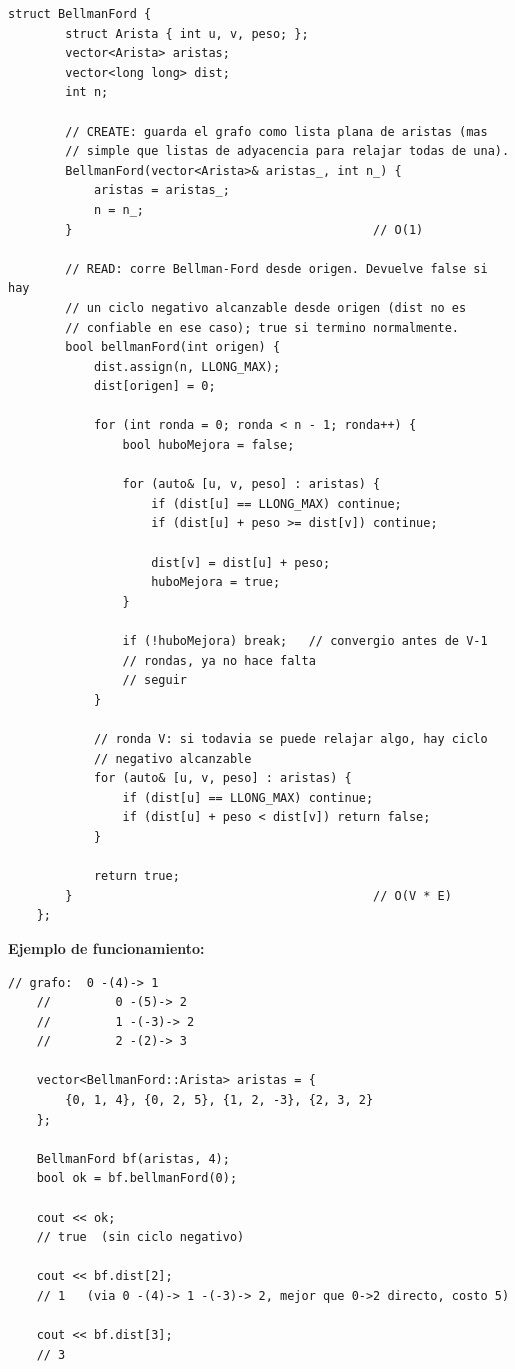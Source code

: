 \documentclass[10pt,a4paper,twocolumn]{article}
\begin{document}
\begin{lstlisting}[style=cpp]
	struct BellmanFord {
		struct Arista { int u, v, peso; };
		vector<Arista> aristas;
		vector<long long> dist;
		int n;
		
		// CREATE: guarda el grafo como lista plana de aristas (mas
		// simple que listas de adyacencia para relajar todas de una).
		BellmanFord(vector<Arista>& aristas_, int n_) {
			aristas = aristas_;
			n = n_;
		}                                          // O(1)
		
		// READ: corre Bellman-Ford desde origen. Devuelve false si hay
		// un ciclo negativo alcanzable desde origen (dist no es
		// confiable en ese caso); true si termino normalmente.
		bool bellmanFord(int origen) {
			dist.assign(n, LLONG_MAX);
			dist[origen] = 0;
			
			for (int ronda = 0; ronda < n - 1; ronda++) {
				bool huboMejora = false;
				
				for (auto& [u, v, peso] : aristas) {
					if (dist[u] == LLONG_MAX) continue;
					if (dist[u] + peso >= dist[v]) continue;
					
					dist[v] = dist[u] + peso;
					huboMejora = true;
				}
				
				if (!huboMejora) break;   // convergio antes de V-1
				// rondas, ya no hace falta
				// seguir
			}
			
			// ronda V: si todavia se puede relajar algo, hay ciclo
			// negativo alcanzable
			for (auto& [u, v, peso] : aristas) {
				if (dist[u] == LLONG_MAX) continue;
				if (dist[u] + peso < dist[v]) return false;
			}
			
			return true;
		}                                          // O(V * E)
	};
\end{lstlisting}

\textbf{Ejemplo de funcionamiento:}

\begin{lstlisting}[style=cpp]
	// grafo:  0 -(4)-> 1
	//         0 -(5)-> 2
	//         1 -(-3)-> 2
	//         2 -(2)-> 3
	
	vector<BellmanFord::Arista> aristas = {
		{0, 1, 4}, {0, 2, 5}, {1, 2, -3}, {2, 3, 2}
	};
	
	BellmanFord bf(aristas, 4);
	bool ok = bf.bellmanFord(0);
	
	cout << ok;
	// true  (sin ciclo negativo)
	
	cout << bf.dist[2];
	// 1   (via 0 -(4)-> 1 -(-3)-> 2, mejor que 0->2 directo, costo 5)
	
	cout << bf.dist[3];
	// 3
\end{lstlisting}
\end{document}
